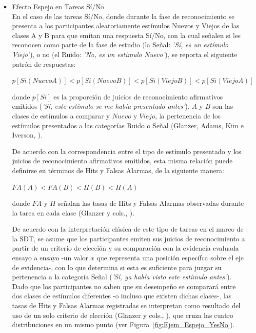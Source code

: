 \begin{itemize}
\item \underline{Efecto Espejo en Tareas Sí/No}\\

En el caso de las tareas Sí/No, donde durante la fase de reconocimiento se presenta a los participantes aleatoriamente estímulos Nuevos y Viejos de las clases A y B para que emitan una respuesta Sí/No, con la cual señalen si les reconocen como parte de la fase de estudio (la Señal: \textit{'Sí, es un estímulo Viejo'}), o no (el Ruido: \textit{'No, es un estímulo Nuevo'}), se reporta el siguiente patrón de respuestas:\\

\begin{center}
$p[Si(NuevoA)] < p[Si(NuevoB)] < p[Si(ViejoB)] < p[Si(ViejoA)]$\\
\end{center}
\begin{center}
donde $p[Si]$ es la proporción de juicios de reconocimiento afirmativos emitidos (\textit{'Sí, este estímulo se me había presentado antes'}), $A$ y $B$ son las clases de estímulos a comparar y $Nuevo$ y $Viejo$, la pertenencia de los estímulos presentados a las categorías Ruido o Señal (Glanzer, Adams, Kim e Iverson, \citeyear{Glanzer1993}).\\
\end{center}

De acuerdo con la correspondencia entre el tipo de estímulo presentado y los juicios de reconocimiento afirmativos emitidos, esta misma relación puede definirse en términos de Hits y Falsas Alarmas, de la siguiente manera:\\

\begin{center}
$FA(A) < FA(B) < H(B) < H(A)$\\
\end{center}
\begin{center}
donde $FA$ y $H$ señalan las tasas de Hits y Falsas Alarmas observadas durante la tarea en cada clase (Glanzer y cols., \citeyear{Glanzer1993}).\\
\end{center}

De acuerdo con la interpretación clásica de este tipo de tareas en el marco de la SDT, se asume que los participantes emiten sus juicios de reconocimiento a partir de un criterio de elección y su comparación con la evidencia evaluada ensayo a ensayo -un valor $x$ que representa una posición específca sobre el eje de evidencia-, con lo que determina si esta es suficiente para juzgar su pertenencia a la categoría Señal (\textit{'Sí, ya había visto este estímulo antes'}). Dado que los participantes no saben que su desempeño se comparará entre dos clases de estímulos diferentes -o incluso que existen dichas clases-, las tasas de Hits y Falsas Alarmas registradas se interpretan como resultado del uso de un solo criterio de elección (Glanzer y cols., \citeyear{Glanzer1993}), que cruza las cuatro distribuciones en un mismo punto (ver Figura~\ref{fig:Ejem_Espejo_YesNo}).\\


\end{itemize}
